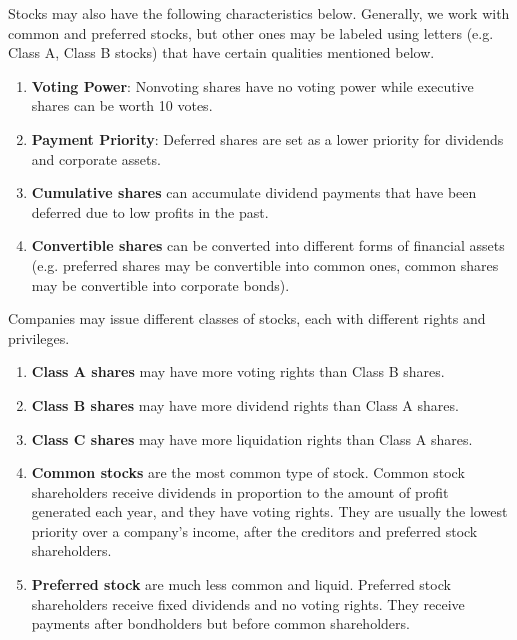 \documentclass{article}
\begin{document}
    \begin{definition}
      Stocks may also have the following characteristics below. Generally, we work with common and preferred stocks, but other ones may be labeled using letters (e.g. Class A, Class B stocks) that have certain qualities mentioned below. 
      \begin{enumerate}
        \item \textbf{Voting Power}: Nonvoting shares have no voting power while executive shares can be worth 10 votes. 
        \item \textbf{Payment Priority}: Deferred shares are set as a lower priority for dividends and corporate assets. 
        \item \textbf{Cumulative shares} can accumulate dividend payments that have been deferred due to low profits in the past. 
        \item \textbf{Convertible shares} can be converted into different forms of financial assets (e.g. preferred shares may be convertible into common ones, common shares may be convertible into corporate bonds).
      \end{enumerate}
    \end{definition}

    \begin{definition}
      Companies may issue different classes of stocks, each with different rights and privileges. 
      \begin{enumerate}
        \item \textbf{Class A shares} may have more voting rights than Class B shares. 
        \item \textbf{Class B shares} may have more dividend rights than Class A shares. 
        \item \textbf{Class C shares} may have more liquidation rights than Class A shares. 
        \item \textbf{Common stocks} are the most common type of stock. Common stock shareholders receive dividends in proportion to the amount of profit generated each year, and they have voting rights. They are usually the lowest priority over a company's income, after the creditors and preferred stock shareholders. 
        \item \textbf{Preferred stock} are much less common and liquid. Preferred stock shareholders receive fixed dividends and no voting rights. They receive payments after bondholders but before common shareholders. 
      \end{enumerate}
    \end{definition}
\end{document}

